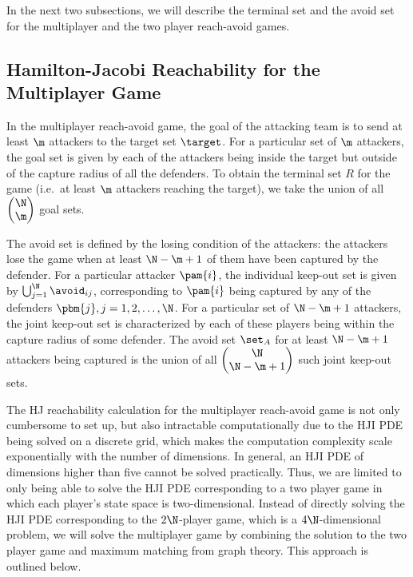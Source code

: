 In the next two subsections, we will describe the terminal set and the avoid set for the multiplayer and the two player reach-avoid games.

\subsection{Hamilton-Jacobi Reachability for the Multiplayer Game}
\label{subsec:hj_multi}
In the multiplayer reach-avoid game, the goal of the attacking team is to send at least $\m$ attackers to the target set $\target$. For a particular set of $\m$ attackers, the goal set is given by each of the attackers being inside the target but outside of the capture radius of all the defenders. To obtain the terminal set $R$ for the game (i.e.\ at least $\m$ attackers reaching the target), we take the union of all $\begin{pmatrix} \N \\ \m \end{pmatrix}$ goal sets.

The avoid set is defined by the losing condition of the attackers: the attackers lose the game when at least $\N-\m+1$ of them have been captured by the defender. For a particular attacker $\pam{i}$, the individual keep-out set is given by $\bigcup_{j=1}^\N \avoid_{ij}$, corresponding to $\pam{i}$ being captured by any of the defenders $\pbm{j},j=1,2,\ldots,\N$. For a particular set of $\N-\m+1$ attackers, the joint keep-out set is characterized by each of these players being within the capture radius of some defender. The avoid set $\set_A$ for at least $\N-\m+1$ attackers being captured is the union of all $\begin{pmatrix} \N \\ \N-\m+1 \end{pmatrix}$ such joint keep-out sets. %

The HJ reachability calculation for the multiplayer reach-avoid game is not only cumbersome to set up, but also intractable computationally due to the HJI PDE being solved on a discrete grid, which makes the computation complexity scale exponentially with the number of dimensions. In general, an HJI PDE of dimensions higher than five cannot be solved practically. Thus, we are limited to only being able to solve the HJI PDE corresponding to a two player game in which each player's state space is two-dimensional. Instead of directly solving the HJI PDE corresponding to the $2\N$-player game, which is a $4\N$-dimensional problem, we will solve the multiplayer game by combining the solution to the two player game and maximum matching from graph theory. This approach is outlined below.

